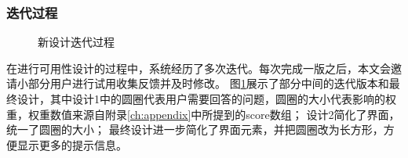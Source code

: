 \subsubsection{迭代过程}
\begin{figure}[h]
    \centering
    \caption{新设计迭代过程}
    \label{fig:diag_new}
\end{figure}
在进行可用性设计的过程中，系统经历了多次迭代。每次完成一版之后，本文会邀请小部分用户进行试用收集反馈并及时修改。
图\ref{fig:diag_new}展示了部分中间的迭代版本和最终设计，其中设计1中的圆圈代表用户需要回答的问题，圆圈的大小代表影响的权重，权重数值来源自附录\ref{ch:appendix}中所提到的score数组；
设计2简化了界面，统一了圆圈的大小；
最终设计进一步简化了界面元素，并把圆圈改为长方形，方便显示更多的提示信息。

